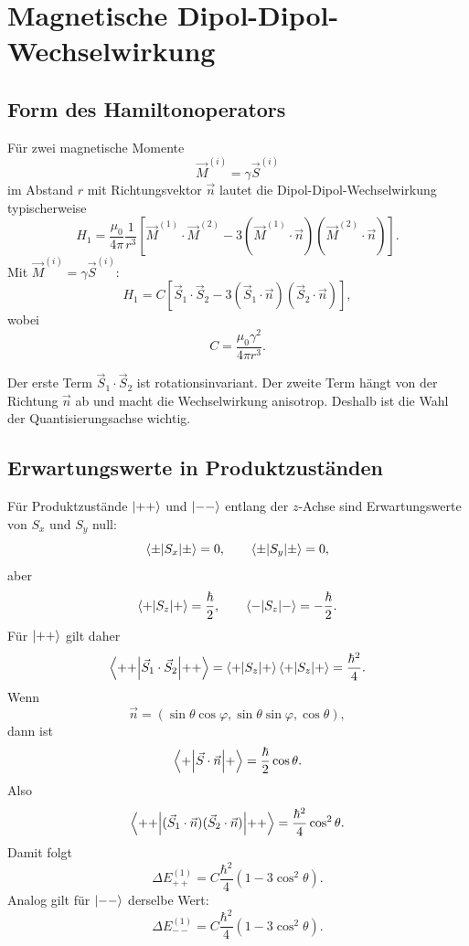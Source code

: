\section{Magnetische Dipol-Dipol-Wechselwirkung}

\subsection{Form des Hamiltonoperators}

Für zwei magnetische Momente
\[
    \vec M^{(i)}=\gamma\vec S^{(i)}
\]
im Abstand \(r\) mit Richtungsvektor \(\vec n\) lautet die Dipol-Dipol-Wechselwirkung typischerweise
\[
    H_1=\frac{\mu_0}{4\pi}\frac{1}{r^3}
    \left[
        \vec M^{(1)}\cdot\vec M^{(2)}
        -3(\vec M^{(1)}\cdot\vec n)(\vec M^{(2)}\cdot\vec n)
    \right].
\]
Mit \(\vec M^{(i)}=\gamma\vec S^{(i)}\):
\[
    H_1=C\left[
        \vec S_1\cdot\vec S_2
        -3(\vec S_1\cdot\vec n)(\vec S_2\cdot\vec n)
    \right],
\]
wobei
\[
    C=\frac{\mu_0\gamma^2}{4\pi r^3}.
\]

\begin{notebox}
Der erste Term \(\vec S_1\cdot\vec S_2\) ist rotationsinvariant. Der zweite Term hängt von der Richtung \(\vec n\) ab und macht die Wechselwirkung anisotrop. Deshalb ist die Wahl der Quantisierungsachse wichtig.
\end{notebox}

\subsection{Erwartungswerte in Produktzuständen}

Für Produktzustände \(\left|++\right\rangle\) und \(\left|--\right\rangle\) entlang der \(z\)-Achse sind Erwartungswerte von \(S_x\) und \(S_y\) null:
\[
    \left\langle\pm\middle|S_x\middle|\pm\right\rangle=0,
    \qquad
    \left\langle\pm\middle|S_y\middle|\pm\right\rangle=0,
\]
aber
\[
    \left\langle+\middle|S_z\middle|+\right\rangle=\frac\hbar2,
    \qquad
    \left\langle-\middle|S_z\middle|-\right\rangle=-\frac\hbar2.
\]
Für \(\left|++\right\rangle\) gilt daher
\[
    \left\langle++\middle|\vec S_1\cdot\vec S_2\middle|++\right\rangle
    =\left\langle+\middle|S_z\middle|+\right\rangle\left\langle+\middle|S_z\middle|+\right\rangle
    =\frac{\hbar^2}{4}.
\]
Wenn
\[
    \vec n=(\sin\theta\cos\varphi,\sin\theta\sin\varphi,\cos\theta),
\]
dann ist
\[
    \left\langle+\middle|\vec S\cdot\vec n\middle|+\right\rangle
    =\frac\hbar2\cos\theta.
\]
Also
\[
    \left\langle++\middle|(\vec S_1\cdot\vec n)(\vec S_2\cdot\vec n)\middle|++\right\rangle
    =\frac{\hbar^2}{4}\cos^2\theta.
\]
Damit folgt
\[
    \Delta E_{++}^{(1)}
    =C\frac{\hbar^2}{4}(1-3\cos^2\theta).
\]
Analog gilt für \(\left|--\right\rangle\) derselbe Wert:
\[
    \Delta E_{--}^{(1)}
    =C\frac{\hbar^2}{4}(1-3\cos^2\theta).
\]

